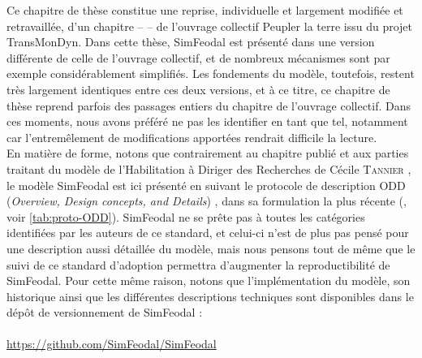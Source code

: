 \begin{mdframed}[backgroundcolor=gray!10,footnoteinside=false]
\begin{multicols}{2}
\begin{itemize}
\end{itemize}
Ce chapitre de thèse constitue une reprise, individuelle et largement modifiée et retravaillée, d'un chapitre --  \autocite{cura_transition_2017} -- de l'ouvrage collectif \og Peupler la terre\fg{} \autocite{sanders2018peupler} issu du projet TransMonDyn\footnotemark.
Dans cette thèse, SimFeodal est présenté dans une version différente de celle de l'ouvrage collectif, et de nombreux mécanismes sont par exemple considérablement simplifiés.
Les fondements du modèle, toutefois, restent très largement identiques entre ces deux versions, et à ce titre, ce chapitre de thèse reprend parfois des passages entiers du chapitre de l'ouvrage collectif.
Dans ces moments, nous avons préféré ne pas les identifier en tant que tel, notamment car l'entremêlement de modifications apportées rendrait difficile la lecture.\\
En matière de forme, notons que contrairement au chapitre publié et aux parties traitant du modèle de l'Habilitation à Diriger des Recherches de Cécile \textsc{Tannier} \autocite{tannier_analyse_2017}, le modèle SimFeodal est ici présenté en suivant le protocole de description \og ODD\fg{} (\textit{Overview, Design concepts, and Details}) \autocite{grimm_odd_2010}, dans sa formulation la plus récente (\cite{grimm_documenting_2017}, voir \cref{tab:proto-ODD}).
SimFeodal ne se prête pas à toutes les catégories identifiées par les auteurs de ce standard, et celui-ci n'est de plus pas pensé pour une description aussi détaillée du modèle\footnotemark, mais nous pensons tout de même que le suivi de ce standard d'adoption permettra d'augmenter la reproductibilité de SimFeodal.
Pour cette même raison, notons que l'implémentation du modèle, son historique ainsi que les différentes descriptions techniques sont disponibles dans le dépôt de versionnement de SimFeodal :\\ \\
\footnotesize
\href{https://github.com/SimFeodal/SimFeodal}{https://github.com/SimFeodal/SimFeodal}

\end{multicols}

\end{mdframed}

